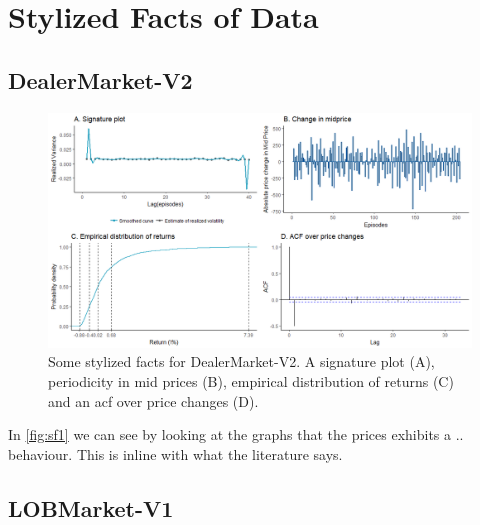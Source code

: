 \documentclass{kththesis}
\theoremstyle{definition}
\begin{document}
\section{Stylized Facts of Data}

\subsection*{DealerMarket-V2}

\begin{figure}[H]
		\centering
		\includegraphics[scale=.5]{dmv1_sf_multi.png}
		\caption{Some stylized facts for DealerMarket-V2. A signature plot (A), periodicity in mid prices (B), empirical distribution of returns (C) and an acf over price changes (D). }
		\label{fig:sf1}
\end{figure}
In \autoref{fig:sf1} we can see by looking at the graphs that the prices exhibits a .. behaviour. This is inline with what the literature says.

\newpage

\subsection*{LOBMarket-V1}
\end{document}
